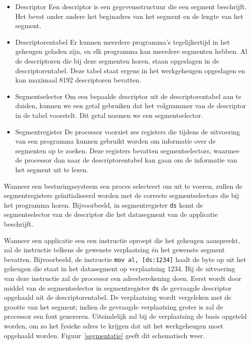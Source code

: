\begin{itemize}
\item{Descriptor} Een descriptor is een gegevensstructuur die
een segment beschrijft. Het bevat onder andere het beginadres van het segment en
de lengte van het segment.
\item{Descriptorentabel} Er kunnen meerdere
programma's tegelijkertijd in het geheugen geladen zijn, en elk programma kan
meerdere segmenten hebben. Al de descriptoren die bij deze segmenten horen,
staan opgeslagen in de descriptorentabel. Deze tabel staat ergens in het
werkgeheugen opgeslagen en kan maximaal 8192 descriptoren bevatten.
\item{Segmentselector} Om een bepaalde descriptor uit de descriptorentabel aan
te duiden, kunnen we een getal gebruiken dat het volgnummer van de descriptor in
de tabel voorstelt. Dit getal noemen we een segmentselector.
\item{Segmentregister} De processor voorziet zes registers die tijdens de
uitvoering van een programma kunnen gebruikt worden om informatie over de
segmenten op te zoeken. Deze registers bevatten segmentselectors, waarmee de
processor dan naar de descriptorentabel kan gaan om de informatie van het
segment uit te lezen.
\end{itemize}

Wanneer een besturingssysteem een proces selecteert om uit te voeren, zullen de
segmentregisters ge\"initialiseerd worden met de correcte segmentselectors die
bij het programma horen. Bijvoorbeeld, in segmentregister \texttt{ds} komt de segmentselector
van de descriptor die het datasegment van de applicatie beschrijft.

Wanneer een applicatie een een instructie oproept die het geheugen aanspreekt, zal de instructie telkens de gewenste verplaatsing \'en het gewenste segment bevatten. Bijvoorbeeld, de instructie \texttt{mov al, [ds:1234]} haalt de byte op uit het geheugen die staat in het datasegment op verplaatsing 1234. Bij de uitvoering van deze instructie zal de processor een adresberekening doen. Eerst wordt door middel van de segmentselector in segmentregister \texttt{ds} de gevraagde descriptor opgehaald uit de descriptorentabel. De verplaatsing wordt vergeleken met de grootte van het segment; indien de gevraagde verplaatsing groter is zal de processor een fout genereren. Uiteindelijk zal bij de verplaatsing de basis opgeteld worden, om zo het fysieke adres te krijgen dat uit het werkgeheugen moet opgehaald worden. Figuur~\ref{segmentatie} geeft dit schematisch weer.

